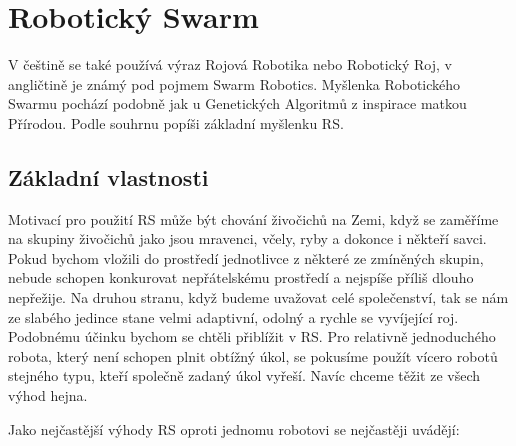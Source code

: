 
\chapter{Robotický Swarm}
V češtině se také používá výraz Rojová Robotika nebo Robotický Roj, v angličtině je známý pod pojmem Swarm Robotics. Myšlenka Robotického Swarmu pochází podobně jak u Genetických Algoritmů z inspirace matkou Přírodou. Podle souhrnu \cite{swarmRobotic} popíši základní myšlenku RS.
\section{Základní vlastnosti}
Motivací pro použití RS může být chování živočichů na Zemi, když se zaměříme na skupiny živočichů jako jsou mravenci, včely, ryby a dokonce i někteří savci. Pokud bychom vložili do prostředí jednotlivce z některé ze zmíněných skupin, nebude schopen konkurovat nepřátelskému prostředí a nejspíše příliš dlouho nepřežije. Na druhou stranu, když budeme uvažovat celé společenství, tak se nám ze slabého jedince stane velmi adaptivní, odolný a rychle se vyvíjející roj. Podobnému účinku bychom se chtěli přiblížit v RS. Pro relativně jednoduchého robota, který není schopen plnit obtížný úkol, se pokusíme použít vícero robotů stejného typu, kteří společně zadaný úkol vyřeší. Navíc chceme těžit ze všech výhod hejna. \par
Jako nejčastější výhody RS oproti jednomu robotovi se nejčastěji uvádějí:
